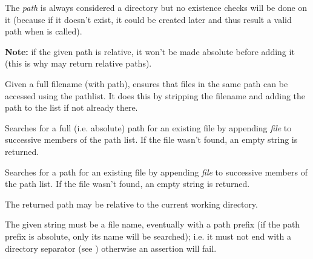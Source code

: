 The {\it path} is always considered a directory but no existence checks will be done on it
(because if it doesn't exist, it could be created later and thus result a valid path when
 is called).

{\bf Note:} if the given path is relative, it won't be made absolute before adding it
(this is why  may return relative paths).


\label{wxpathlistensurefileaccessible}


Given a full filename (with path), ensures that files in the same path
can be accessed using the pathlist. It does this by stripping the
filename and adding the path to the list if not already there.


\label{wxpathlistfindabsolutepath}


Searches for a full (i.e. absolute) path for an existing file by appending {\it file} to
successive members of the path list.  If the file wasn't found, an empty
string is returned.


\label{wxpathlistfindvalidpath}


Searches for a path for an existing file by appending {\it file} to
successive members of the path list.
If the file wasn't found, an empty string is returned.

The returned path may be relative to the current working directory.

The given string must be a file name, eventually with a path prefix (if the path
prefix is absolute, only its name will be searched); i.e. it must not end with
a directory separator (see )
otherwise an assertion will fail.
